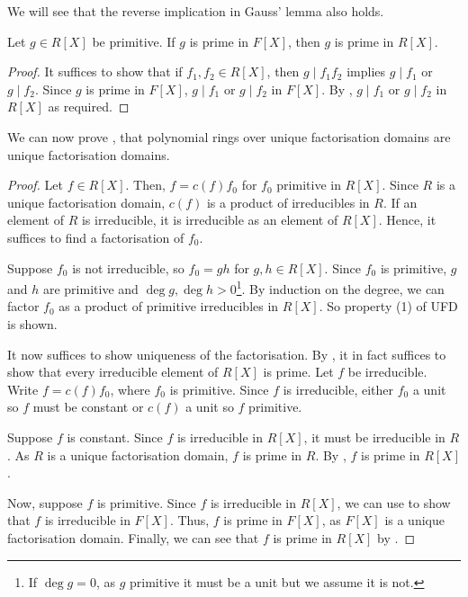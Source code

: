 \begin{remark}
	We will see that the reverse implication in Gauss' lemma also holds.
\end{remark}

\begin{lemma} \label{lem:11.5}
	Let $g \in R[X]$ be primitive.
	If $g$ is prime in $F[X]$, then $g$ is prime in $R[X]$.
\end{lemma}

\begin{proof}
	It suffices to show that if $f_1, f_2 \in R[X]$, then $g \mid f_1 f_2$ implies $g \mid f_1$ or $g \mid f_2$.
	Since $g$ is prime in $F[X]$, $g \mid f_1$ or $g \mid f_2$ in $F[X]$.
	By , $g \mid f_1$ or $g \mid f_2$ in $R[X]$ as required.
\end{proof}

We can now prove , that polynomial rings over unique factorisation domains are unique factorisation domains.

\begin{proof} \label{prf:11.1}
	Let $f \in R[X]$.
	Then, $f = c(f) f_0$ for $f_0$ primitive in $R[X]$.
	Since $R$ is a unique factorisation domain, $c(f)$ is a product of irreducibles in $R$.
	If an element of $R$ is irreducible, it is irreducible as an element of $R[X]$.
	Hence, it suffices to find a factorisation of $f_0$.

	Suppose $f_0$ is not irreducible, so $f_0 = gh$ for $g,h \in R[X]$.
	Since $f_0$ is primitive, $g$ and $h$ are primitive and $\deg g, \deg h > 0$\footnote{If $\deg g = 0$, as $g$ primitive it must be a unit but we assume it is not.}.
	By induction on the degree, we can factor $f_0$ as a product of primitive irreducibles in $R[X]$.
	So property (1) of UFD is shown.

	It now suffices to show uniqueness of the factorisation.
	By , it in fact suffices to show that every irreducible element of $R[X]$ is prime.
	Let $f$ be irreducible.
	Write $f = c(f) f_0$, where $f_0$ is primitive.
	Since $f$ is irreducible, either $f_0$ a unit so $f$ must be constant or $c(f)$ a unit so $f$ primitive.

	Suppose $f$ is constant.
	Since $f$ is irreducible in $R[X]$, it must be irreducible in $R$.
	As $R$ is a unique factorisation domain, $f$ is prime in $R$.
	By , $f$ is prime in $R[X]$.

	Now, suppose $f$ is primitive.
	Since $f$ is irreducible in $R[X]$, we can use  to show that $f$ is irreducible in $F[X]$.
	Thus, $f$ is prime in $F[X]$, as $F[X]$ is a unique factorisation domain.
	Finally, we can see that $f$ is prime in $R[X]$ by .
\end{proof}

